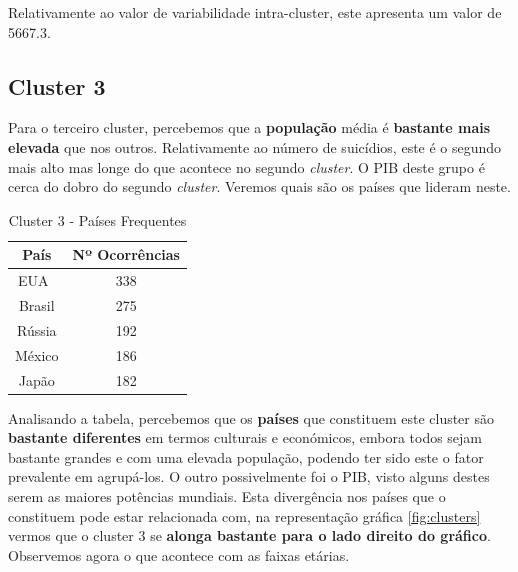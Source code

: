 \documentclass[a4paper,12pt]{article}
\begin{document}
Relativamente ao valor de variabilidade intra-cluster, este apresenta um valor de 5667.3. 

\subsection{Cluster 3}

Para o terceiro cluster, percebemos que a \textbf{população} média é \textbf{bastante mais elevada} que nos outros. Relativamente ao número de suicídios, este é o segundo mais alto mas longe do que acontece no segundo \textit{cluster}. O PIB deste grupo é cerca do dobro do segundo \textit{cluster}. Veremos quais são os países que lideram neste.


\begin{table}[H]
	\centering
	\caption{Cluster 3 - Países Frequentes}
	\begin{tabular}{|c|c|} 
		\hline
		\rowcolor[rgb]{0.678,1,0.851} País & Nº Ocorrências  \\ 
		\hline
		EUA~                               & 338             \\ 
		\hline
		Brasil                             & 275             \\ 
		\hline
		Rússia                             & 192             \\ 
		\hline
		México                             & 186             \\ 
		\hline
		Japão                              & 182             \\
		\hline
	\end{tabular}
\end{table}

Analisando a tabela, percebemos que os \textbf{países} que constituem este cluster são \textbf{bastante diferentes} em termos culturais e económicos, embora todos sejam bastante grandes e com uma elevada população, podendo ter sido este o fator prevalente em agrupá-los. O outro possivelmente foi o PIB, visto alguns destes serem as maiores potências mundiais. Esta divergência nos países que o constituem pode estar relacionada com, na representação gráfica \ref{fig:clusters} vermos que o cluster 3 se \textbf{alonga bastante para o lado direito do gráfico}.
Observemos agora o que acontece com as faixas etárias.
\end{document}
